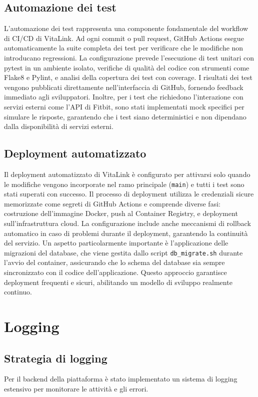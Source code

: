 \documentclass[12pt,a4paper,oneside]{report}
\begin{document}
\subsection{Automazione dei test}
L'automazione dei test rappresenta una componente fondamentale del workflow di CI/CD di VitaLink. Ad ogni commit o pull request, GitHub Actions esegue automaticamente la suite completa dei test per verificare che le modifiche non introducano regressioni. La configurazione prevede l'esecuzione di test unitari con pytest in un ambiente isolato, verifiche di qualità del codice con strumenti come Flake8 e Pylint, e analisi della copertura dei test con coverage. I risultati dei test vengono pubblicati direttamente nell'interfaccia di GitHub, fornendo feedback immediato agli sviluppatori. Inoltre, per i test che richiedono l'interazione con servizi esterni come l'API di Fitbit, sono stati implementati mock specifici per simulare le risposte, garantendo che i test siano deterministici e non dipendano dalla disponibilità di servizi esterni.

\subsection{Deployment automatizzato}
Il deployment automatizzato di VitaLink è configurato per attivarsi solo quando le modifiche vengono incorporate nel ramo principale (\texttt{main}) e tutti i test sono stati superati con successo. Il processo di deployment utilizza le credenziali sicure memorizzate come segreti di GitHub Actions e comprende diverse fasi: costruzione dell'immagine Docker, push al Container Registry, e deployment sull'infrastruttura cloud. La configurazione include anche meccanismi di rollback automatico in caso di problemi durante il deployment, garantendo la continuità del servizio. Un aspetto particolarmente importante è l'applicazione delle migrazioni del database, che viene gestita dallo script \texttt{db\_migrate.sh} durante l'avvio del container, assicurando che lo schema del database sia sempre sincronizzato con il codice dell'applicazione. Questo approccio garantisce deployment frequenti e sicuri, abilitando un modello di sviluppo realmente continuo.

\section{Logging}
\subsection{Strategia di logging}
Per il backend della piattaforma è stato implementato un sistema di logging estensivo per monitorare le attività e gli errori.
\end{document}
